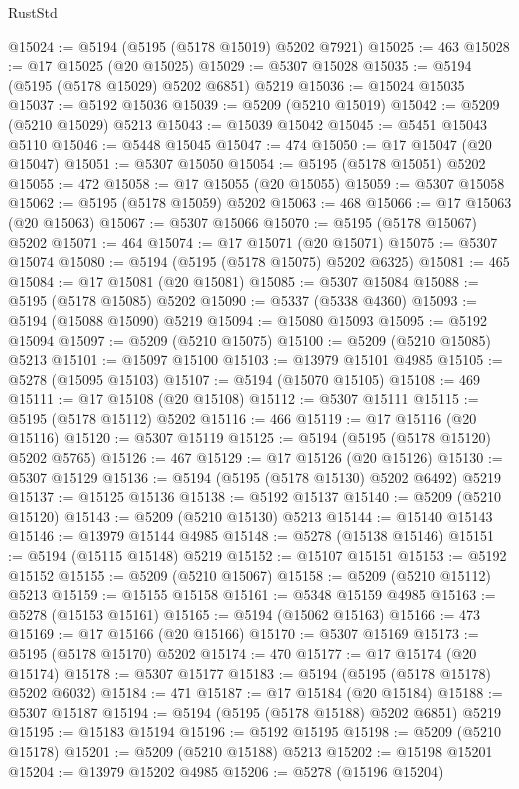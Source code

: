 \begin{lexlean}{RustStd}
\begin{coremodule}
@15024 := @5194 (@5195 (@5178 @15019) @5202 @7921)
@15025 := 463
@15028 := @17 @15025 (@20 @15025)
@15029 := @5307 @15028
@15035 := @5194 (@5195 (@5178 @15029) @5202 @6851) @5219
@15036 := @15024 @15035
@15037 := @5192 @15036
@15039 := @5209 (@5210 @15019)
@15042 := @5209 (@5210 @15029) @5213
@15043 := @15039 @15042
@15045 := @5451 @15043 @5110
@15046 := @5448 @15045
@15047 := 474
@15050 := @17 @15047 (@20 @15047)
@15051 := @5307 @15050
@15054 := @5195 (@5178 @15051) @5202
@15055 := 472
@15058 := @17 @15055 (@20 @15055)
@15059 := @5307 @15058
@15062 := @5195 (@5178 @15059) @5202
@15063 := 468
@15066 := @17 @15063 (@20 @15063)
@15067 := @5307 @15066
@15070 := @5195 (@5178 @15067) @5202
@15071 := 464
@15074 := @17 @15071 (@20 @15071)
@15075 := @5307 @15074
@15080 := @5194 (@5195 (@5178 @15075) @5202 @6325)
@15081 := 465
@15084 := @17 @15081 (@20 @15081)
@15085 := @5307 @15084
@15088 := @5195 (@5178 @15085) @5202
@15090 := @5337 (@5338 @4360)
@15093 := @5194 (@15088 @15090) @5219
@15094 := @15080 @15093
@15095 := @5192 @15094
@15097 := @5209 (@5210 @15075)
@15100 := @5209 (@5210 @15085) @5213
@15101 := @15097 @15100
@15103 := @13979 @15101 @4985
@15105 := @5278 (@15095 @15103)
@15107 := @5194 (@15070 @15105)
@15108 := 469
@15111 := @17 @15108 (@20 @15108)
@15112 := @5307 @15111
@15115 := @5195 (@5178 @15112) @5202
@15116 := 466
@15119 := @17 @15116 (@20 @15116)
@15120 := @5307 @15119
@15125 := @5194 (@5195 (@5178 @15120) @5202 @5765)
@15126 := 467
@15129 := @17 @15126 (@20 @15126)
@15130 := @5307 @15129
@15136 := @5194 (@5195 (@5178 @15130) @5202 @6492) @5219
@15137 := @15125 @15136
@15138 := @5192 @15137
@15140 := @5209 (@5210 @15120)
@15143 := @5209 (@5210 @15130) @5213
@15144 := @15140 @15143
@15146 := @13979 @15144 @4985
@15148 := @5278 (@15138 @15146)
@15151 := @5194 (@15115 @15148) @5219
@15152 := @15107 @15151
@15153 := @5192 @15152
@15155 := @5209 (@5210 @15067)
@15158 := @5209 (@5210 @15112) @5213
@15159 := @15155 @15158
@15161 := @5348 @15159 @4985
@15163 := @5278 (@15153 @15161)
@15165 := @5194 (@15062 @15163)
@15166 := 473
@15169 := @17 @15166 (@20 @15166)
@15170 := @5307 @15169
@15173 := @5195 (@5178 @15170) @5202
@15174 := 470
@15177 := @17 @15174 (@20 @15174)
@15178 := @5307 @15177
@15183 := @5194 (@5195 (@5178 @15178) @5202 @6032)
@15184 := 471
@15187 := @17 @15184 (@20 @15184)
@15188 := @5307 @15187
@15194 := @5194 (@5195 (@5178 @15188) @5202 @6851) @5219
@15195 := @15183 @15194
@15196 := @5192 @15195
@15198 := @5209 (@5210 @15178)
@15201 := @5209 (@5210 @15188) @5213
@15202 := @15198 @15201
@15204 := @13979 @15202 @4985
@15206 := @5278 (@15196 @15204)

\end{coremodule}
\end{lexlean}
